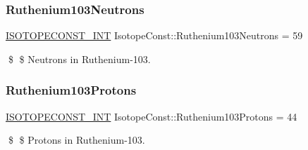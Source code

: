 \subsubsection{\texorpdfstring{Ruthenium103\+Neutrons}{Ruthenium103Neutrons}}
{\footnotesize\ttfamily \mbox{\hyperlink{group___isotope_const-_macros_ga5f18360b3e99483a35c32d789e62621c}{I\+S\+O\+T\+O\+P\+E\+C\+O\+N\+S\+T\+\_\+\+I\+NT}} Isotope\+Const\+::\+Ruthenium103\+Neutrons = 59}

\$ \$ Neutrons in Ruthenium-\/103. \mbox{\label{group___isotope_const-_ruthenium-_ru103_ga128bc9503dcae4bb137192a843697511}} 
\subsubsection{\texorpdfstring{Ruthenium103\+Protons}{Ruthenium103Protons}}
{\footnotesize\ttfamily \mbox{\hyperlink{group___isotope_const-_macros_ga5f18360b3e99483a35c32d789e62621c}{I\+S\+O\+T\+O\+P\+E\+C\+O\+N\+S\+T\+\_\+\+I\+NT}} Isotope\+Const\+::\+Ruthenium103\+Protons = 44}

\$ \$ Protons in Ruthenium-\/103. 